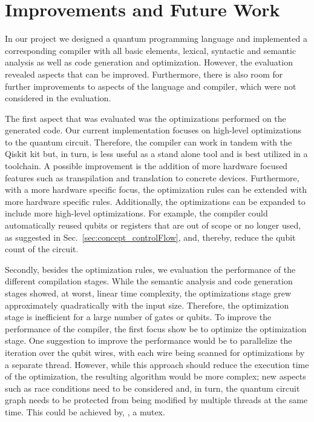 \section{Improvements and Future Work}
In our project we designed a quantum programming language and implemented a corresponding compiler with all basic elements, lexical, syntactic and semantic analysis as well as code generation and optimization. However, the evaluation revealed aspects that can be improved. Furthermore, there is also room for further improvements to aspects of the language and compiler, which were not considered in the evaluation.

The first aspect that was evaluated was the optimizations performed on the generated code. Our current implementation focuses on high-level optimizations to the quantum circuit. Therefore, the compiler can work in tandem with the Qiskit kit but, in turn, is less useful as a stand alone tool and is best utilized in a toolchain. A possible improvement is the addition of more hardware focused features such as transpilation and translation to concrete devices. Furthermore, with a more hardware specific focus, the optimization rules can be extended with more hardware specific rules.   
Additionally, the optimizations can be expanded to include more high-level optimizations. For example, the compiler could automatically reused qubits or registers that are out of scope or no longer used, as suggested in Sec.~\ref{sec:concept_controlFlow}, and, thereby, reduce the qubit count of the circuit.  

Secondly, besides the optimization rules, we evaluation the performance of the different compilation stages. While the semantic analysis and code generation stages showed, at worst, linear time complexity, the optimizations stage grew approximately quadratically with the input size. Therefore, the optimization stage is inefficient for a large number of gates or qubits. To improve the performance of the compiler, the first focus show be to optimize the optimization stage. One suggestion to improve the performance would be to parallelize the iteration over the qubit wires, with each wire being scanned for optimizations by a separate thread. However, while this approach should reduce the execution time of the optimization, the resulting algorithm would be more complex; new aspects such as race conditions need to be considered and, in turn, the quantum circuit graph needs to be protected from being modified by multiple threads at the same time. This could be achieved by, \eg, a mutex.

